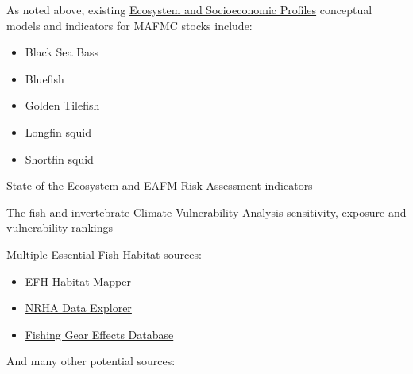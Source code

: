 \documentclass[
]{article}
\providecommand{\tightlist}{%
  \setlength{\itemsep}{0pt}\setlength{\parskip}{0pt}}
\begin{document}
As noted above, existing \href{https://www.fisheries.noaa.gov/new-england-mid-atlantic/ecosystems/ecosystem-and-socioeconomic-profile-development-and-reports}{Ecosystem and Socioeconomic Profiles} conceptual models and indicators for MAFMC stocks include:

\begin{itemize}
\tightlist
\item
  Black Sea Bass
\item
  Bluefish
\item
  Golden Tilefish
\item
  Longfin squid
\item
  Shortfin squid
\end{itemize}

\href{https://www.fisheries.noaa.gov/new-england-mid-atlantic/ecosystems/state-ecosystem-reports-northeast-us-shelf}{State of the Ecosystem} and \href{https://www.mafmc.org/s/2_MAB_RiskAssess_2024.pdf}{EAFM Risk Assessment} indicators

The fish and invertebrate \href{https://journals.plos.org/plosone/article?id=10.1371/journal.pone.0146756}{Climate Vulnerability Analysis} sensitivity, exposure and vulnerability rankings

Multiple Essential Fish Habitat sources:

\begin{itemize}
\tightlist
\item
  \href{https://www.fisheries.noaa.gov/resource/map/essential-fish-habitat-mapper}{EFH Habitat Mapper}
\item
  \href{https://nrha.shinyapps.io/dataexplorer/}{NRHA Data Explorer}
\item
  \href{https://fishmaps.shinyapps.io/FishingEffectsDatabase/}{Fishing Gear Effects Database}
\end{itemize}

And many other potential sources:
\end{document}
